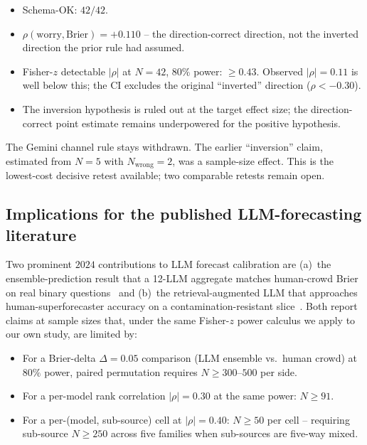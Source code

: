 \documentclass[11pt]{article}
\begin{document}
\begin{itemize}[leftmargin=*]
\item Schema-OK: $42/42$.
\item $\rho(\mathrm{worry}, \mathrm{Brier}) = +0.110$ -- the direction-correct direction, not the inverted direction the prior rule had assumed.
\item Fisher-$z$ detectable $|\rho|$ at $N{=}42$, $80\%$ power: $\geq 0.43$. Observed $|\rho|{=}0.11$ is well below this; the CI excludes the original ``inverted'' direction ($\rho < -0.30$).
\item The inversion hypothesis is ruled out at the target effect size; the direction-correct point estimate remains underpowered for the positive hypothesis.
\end{itemize}

The Gemini channel rule stays withdrawn. The earlier ``inversion'' claim, estimated from $N{=}5$ with $N_{\mathrm{wrong}}{=}2$, was a sample-size effect. This is the lowest-cost decisive retest available; two comparable retests remain open.

\subsection{Implications for the published LLM-forecasting literature}

Two prominent $2024$ contributions to LLM forecast calibration are (a)~the ensemble-prediction result that a 12-LLM aggregate matches human-crowd Brier on real binary questions~\cite{schoenegger2024ensemble} and (b)~the retrieval-augmented LLM that approaches human-superforecaster accuracy on a contamination-resistant slice~\cite{halawi2024approaching}. Both report claims at sample sizes that, under the same Fisher-$z$ power calculus we apply to our own study, are limited by:

\begin{itemize}[leftmargin=*]
\item For a Brier-delta $\Delta{=}0.05$ comparison (LLM ensemble vs.\ human crowd) at $80\%$ power, paired permutation requires $N{\geq}300$--$500$ per side.
\item For a per-model rank correlation $|\rho|{=}0.30$ at the same power: $N{\geq}91$.
\item For a per-(model, sub-source) cell at $|\rho|{=}0.40$: $N{\geq}50$ per cell -- requiring sub-source $N{\geq}250$ across five families when sub-sources are five-way mixed.
\end{itemize}
\end{document}
